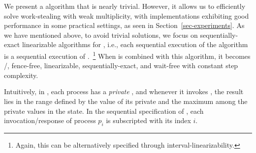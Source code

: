 We present a \RangeMaxReg algorithm that is nearly trivial. However, it allows us to efficiently solve work-stealing with weak multiplicity, with implementations exhibiting good performance in some practical settings, as seen in Section~\ref{sec-experiments}. As we have mentioned above, to avoid trivial solutions, we focus on sequentially-exact linearizable algorithms for \RangeMaxReg, i.e., each sequential execution of the algorithm is a sequential execution of \MaxReg.~\footnote{Again, this can be alternatively specified through interval-linearizability.}  When \NCWSM is combined with this algorithm, it becomes \R/\W, fence-free, linearizable, sequentially-exact, and wait-free with constant step complexity.

Intuitively, in \RangeMaxReg, each process has a \emph{private} \MaxReg, and whenever it invokes \RMaxR, the result lies in the range defined by the value of its private \MaxReg and the maximum among the private {\MaxReg} values in the state. In the sequential specification of \RangeMaxReg, each invocation/response of process $p_i$ is subscripted with its index $i$.




